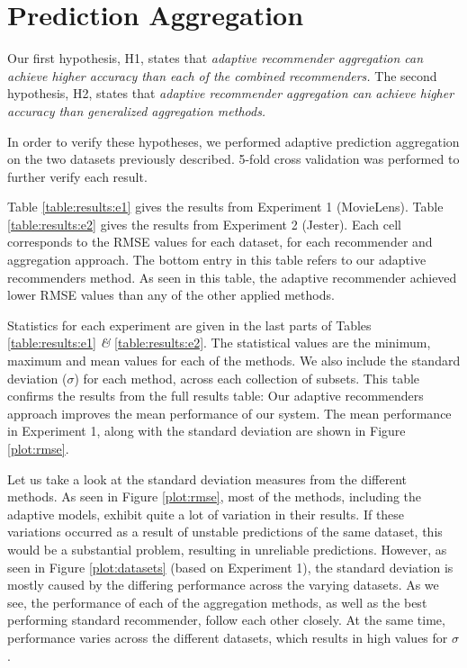 \section{Prediction Aggregation}





Our first hypothesis, H1, states that
{
  \itshape
  adaptive recommender aggregation can achieve higher accuracy
  than each of the combined recommenders.
}
The second hypothesis, H2, states that
{
  \itshape
  adaptive recommender aggregation can achieve higher accuracy than generalized aggregation methods.
}

In order to verify these hypotheses, we performed adaptive prediction aggregation on the two datasets previously described.
5-fold cross validation was performed to further verify each result.

Table \ref{table:results:e1} gives the results from Experiment 1 (MovieLens).
Table \ref{table:results:e2} gives the results from Experiment 2 (Jester).
Each cell corresponds to the RMSE values for each dataset,
for each recommender and aggregation approach.
The bottom entry in this table refers to our adaptive recommenders method.
As seen in this table, the adaptive recommender achieved
lower RMSE values than any of the other applied methods.

Statistics for each experiment are given in the last
parts of Tables \ref{table:results:e1} \emph{\&} \ref{table:results:e2}. 
The statistical values are the minimum, maximum and mean values
for each of the methods. We also include
the standard deviation ($\sigma$) for each method,
across each collection of subsets.
This table confirms the results from the full results table:
Our adaptive recommenders approach improves the mean performance
of our system.
The mean performance in Experiment 1, along with the standard deviation
are shown in Figure \ref{plot:rmse}.


%



Let us take a look at the standard deviation measures from the different methods.
As seen in Figure \ref{plot:rmse}, 
most of the methods, including the adaptive models,
exhibit quite a lot of variation in their results.
If these variations occurred as a result of unstable
predictions of the same dataset, this would be a substantial problem,
resulting in unreliable predictions.
However, as seen in Figure \ref{plot:datasets}
(based on Experiment 1),
the standard deviation is mostly caused by the differing
performance across the varying datasets.
As we see, the performance of each of the aggregation methods,
as well as the best performing standard recommender,
follow each other closely. At the same time,
performance varies across the different datasets,
which results in high values for $\sigma$.

